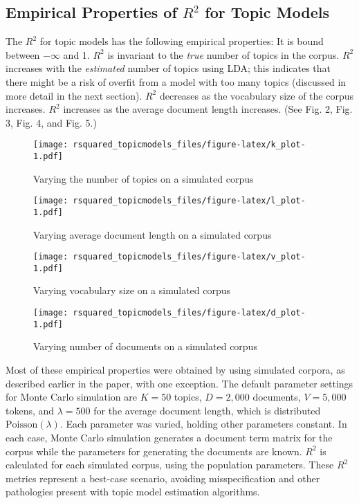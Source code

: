 \documentclass[conference,final,]{IEEEtran}
\makeatletter
\def\maxwidth{\ifdim\Gin@nat@width>\linewidth\linewidth
\else\Gin@nat@width\fi}
\let\Oldincludegraphics\includegraphics
\renewcommand{\includegraphics}[1]{\Oldincludegraphics[width=\maxwidth]{#1}}
\makeatother
\begin{document}
\hypertarget{empirical-properties-of-r2-for-topic-models}{%
\subsection{\texorpdfstring{Empirical Properties of \(R^2\) for Topic
Models}{Empirical Properties of R\^{}2 for Topic Models}}\label{empirical-properties-of-r2-for-topic-models}}

The \(R^2\) for topic models has the following empirical properties: It
is bound between \(-\infty\) and 1. \(R^2\) is invariant to the
\textit{true} number of topics in the corpus. \(R^2\) increases with the
\textit{estimated} number of topics using LDA; this indicates that there
might be a risk of overfit from a model with too many topics (discussed
in more detail in the next section). \(R^2\) decreases as the vocabulary
size of the corpus increases. \(R^2\) increases as the average document
length increases. (See Fig. 2, Fig. 3, Fig. 4, and Fig. 5.)

\begin{figure}
\centering
\texttt{[image: rsquared\_topicmodels\_files/figure-latex/k\_plot-1.pdf]}
\caption{Varying the number of topics on a simulated corpus}
\end{figure}

\begin{figure}
\centering
\texttt{[image: rsquared\_topicmodels\_files/figure-latex/l\_plot-1.pdf]}
\caption{Varying average document length on a simulated corpus}
\end{figure}

\begin{figure}
\centering
\texttt{[image: rsquared\_topicmodels\_files/figure-latex/v\_plot-1.pdf]}
\caption{Varying vocabulary size on a simulated corpus}
\end{figure}

\begin{figure}
\centering
\texttt{[image: rsquared\_topicmodels\_files/figure-latex/d\_plot-1.pdf]}
\caption{Varying number of documents on a simulated corpus}
\end{figure}

Most of these empirical properties were obtained by using simulated
corpora, as described earlier in the paper, with one exception. The
default parameter settings for Monte Carlo simulation are \(K = 50\)
topics, \(D = 2{,}000\) documents, \(V = 5{,}000\) tokens, and
\(\lambda = 500\) for the average document length, which is distributed
\(\text{Poisson}(\lambda)\). Each parameter was varied, holding other
parameters constant. In each case, Monte Carlo simulation generates a
document term matrix for the corpus while the parameters for generating
the documents are known. \(R^2\) is calculated for each simulated
corpus, using the population parameters. These \(R^2\) metrics represent
a best-case scenario, avoiding misspecification and other pathologies
present with topic model estimation algorithms.
\end{document}
